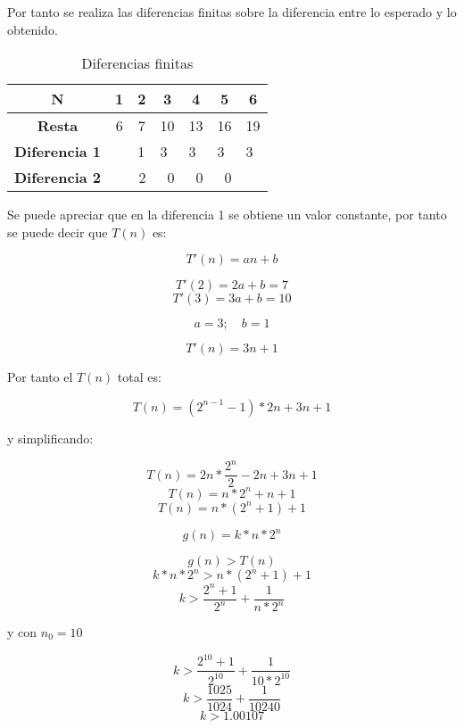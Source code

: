 \documentclass{uc3mpracticas}
\begin{document}
  Por tanto se realiza las diferencias finitas sobre la diferencia entre lo esperado y lo obtenido.




  \begin{table}[!h]
    \centering
  \begin{tabular}{|c|p{1cm}|p{1cm}|p{1cm}|p{1cm}|p{1cm}|p{1cm}|}
  \hline
  \textbf{N}     & \multicolumn{1}{c|}{\textbf{1}} & \multicolumn{1}{c|}{\textbf{2}} & \multicolumn{1}{c|}{\textbf{3}} & \multicolumn{1}{c|}{\textbf{4}} & \multicolumn{1}{c|}{\textbf{5}} & \multicolumn{1}{c|}{\textbf{6}} \\ \hline
  \textbf{Resta} & \multicolumn{1}{c|}{6}& \multicolumn{1}{c|}{7}& \multicolumn{1}{c|}{10}& \multicolumn{1}{c|}{13}& \multicolumn{1}{c|}{16} & \multicolumn{1}{c|}{19}\\ \hline
  \textbf{Diferencia 1}& & 1& 3& 3& 3& 3\\ \hline
  \textbf{Diferencia 2}& & \multicolumn{1}{r|}{2}& \multicolumn{1}{r|}{0}& \multicolumn{1}{r|}{0} & \multicolumn{1}{r|}{0} & \\ \hline
  \end{tabular}
  \caption{Diferencias finitas}
  \end{table}

  Se puede apreciar que en la diferencia 1 se obtiene un valor constante, por tanto se puede decir que $T(n)$ es:

  $$ T'(n)=an + b $$

  $$ T'(2) = 2a + b = 7$$
  $$ T'(3) = 3a + b = 10$$

  $$ a = 3 ;\quad b = 1 $$

  $$ T'(n) = 3n + 1 $$

  Por tanto el $T(n)$ total es:

  $$ T(n) = (2^{n-1} - 1) * 2n + 3n + 1 $$

  y simplificando:

  $$ T(n) = 2n*\frac{2^n}{2} - 2n + 3n + 1 $$
  $$ T(n) = n* 2^n + n + 1 $$
  $$ T(n) = n*(2^n + 1) + 1 $$

  \vspace{2mm}

  $$ g(n) = k*n*2^n $$

  $$ g(n) > T(n) $$
  $$ k*n*2^n > n*(2^n + 1) + 1 $$
  $$ k > \frac{2^n + 1}{2^n} + \frac{1}{n*2^n} $$

  y con $n_0 = 10$


  $$ k > \frac{2^{10} + 1}{2^{10}} + \frac{1}{10*2^{10}} $$
  $$ k > \frac{1025}{1024} + \frac{1}{10240} $$
  $$ k > 1.00107 $$
\end{document}
